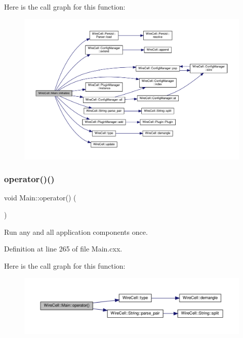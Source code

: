 Here is the call graph for this function\+:
\nopagebreak
\begin{figure}[H]
\begin{center}
\leavevmode
\includegraphics[width=350pt]{class_wire_cell_1_1_main_a7cd2683098093ad0f714873a9112543e_cgraph}
\end{center}
\end{figure}
\mbox{\label{class_wire_cell_1_1_main_a4a7f5c181bfd1cc972156ff96952436a}} 
\subsubsection{\texorpdfstring{operator()()}{operator()()}}
{\footnotesize\ttfamily void Main\+::operator() (\begin{DoxyParamCaption}{ }\end{DoxyParamCaption})}



Run any and all application components once. 



Definition at line 265 of file Main.\+cxx.

Here is the call graph for this function\+:
\nopagebreak
\begin{figure}[H]
\begin{center}
\leavevmode
\includegraphics[width=350pt]{class_wire_cell_1_1_main_a4a7f5c181bfd1cc972156ff96952436a_cgraph}
\end{center}
\end{figure}
\mbox{\label{class_wire_cell_1_1_main_a2b649ad950c80a65798687e79b6bf7bd}} 
